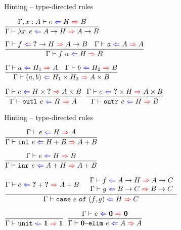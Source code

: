 \documentclass{beamer}
\begin{document}
\begin{frame}{Hinting -- type-directed rules}

\begin{center}
  $\infrule{\hinting[\extend{\Gamma}{x}{A}]{e}{H}{B}}{\hinting{\fun{x}{e}}{\Fun{A}{H}}{\Fun{A}{B}}}$

  \vspace{2em}

  $\infrule{\hinting{f}{\Fun{\Hole}{H}}{\Fun{A}{B}} \quad \hinting{a}{A}{A}}{\hinting{\app{f}{a}}{H}{B}}$

  \vspace{2em}

  $\infrule{\hinting{a}{H_1}{A} \quad \hinting{b}{H_2}{B}}{\hinting{\pair{a}{b}}{\Prod{H_1}{H_2}}{\Prod{A}{B}}}$

  \vspace{2em}

  $\infrule{\hinting{e}{\Prod{H}{\Hole}}{\Prod{A}{B}}}{\hinting{\outl{e}}{H}{A}}$ \quad
  $\infrule{\hinting{e}{\Prod{\Hole}{H}}{\Prod{A}{B}}}{\hinting{\outr{e}}{H}{B}}$
\end{center}

\end{frame}

\begin{frame}{Hinting -- type-directed rules}

\begin{center}
  $\infrule{\hinting{e}{H}{A}}{\hinting{\inl{e}}{\Sum{H}{B}}{\Sum{A}{B}}}$

  \vspace{2em}

  $\infrule{\hinting{e}{H}{B}}{\hinting{\inr{e}}{\Sum{A}{H}}{\Sum{A}{B}}}$

  \vspace{2em}

  $\infrule{\hinting{e}{\Sum{\Hole}{\Hole}}{\Sum{A}{B}} \quad \begin{array}{c} \hinting{f}{\Fun{A}{H}}{\Fun{A}{C}} \\ \hinting{g}{\Fun{B}{C}}{\Fun{B}{C}} \end{array}}{\hinting{\case{e}{f}{g}}{H}{C}}$

  \vspace{2em}

  $\infrule{}{\hinting{\unit}{\Unit}{\Unit}}$ \quad
  $\infrule{\hinting{e}{\Empty}{\Empty}}{\hinting{\emptyelim{e}}{A}{A}}$
\end{center}

\end{frame}
\end{document}
